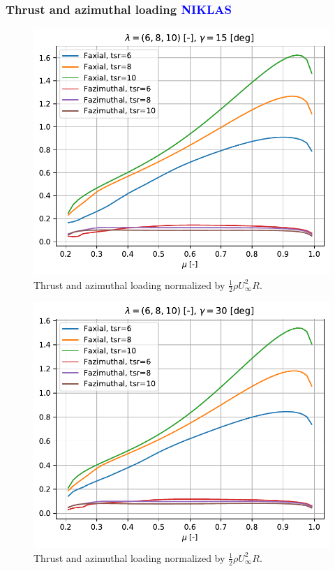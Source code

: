 \subsubsection{\textbf{Thrust and azimuthal loading} \textcolor{blue}{NIKLAS}}
\begin{figure}[htbp]
	\centering
	\includegraphics[height=0.45\textheight]{./img/yaw/Fax_Faz-yaw_15.pdf}
	\caption{Thrust and azimuthal loading normalized by $\frac{1}{2} \rho U_\infty^2 R$.}
	\label{img:yaw-f-15}
\end{figure}
\begin{figure}[htbp]
	\centering
	\includegraphics[height=0.45\textheight]{./img/yaw/Fax_Faz-yaw_30.pdf}
	\caption{Thrust and azimuthal loading normalized by $\frac{1}{2} \rho U_\infty^2 R$.}
	\label{img:yaw-f-30}
\end{figure}
